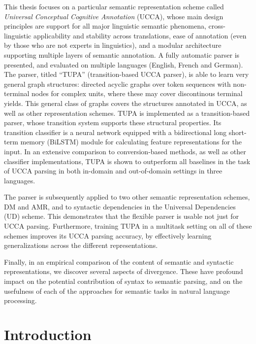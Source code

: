 \documentclass[12pt,a4paper]{report}
\begin{document}
This thesis focuses on a particular semantic representation scheme called
\textit{Universal Conceptual Cognitive Annotation} (UCCA),
whose main design principles are support for all major linguistic semantic phenomena,
cross-linguistic applicability and stability across translations,
ease of annotation (even by those who are not experts in linguistics),
and a modular architecture supporting multiple layers of semantic annotation.
A fully automatic parser is presented, and evaluated on multiple languages
(English, French and German).
The parser, titled ``TUPA'' (transition-based UCCA parser),
is able to learn very general graph structures:
directed acyclic graphs over token sequences with non-terminal nodes for complex
units, where these may cover discontinous terminal yields.
This general class of graphs covers the structures annotated in UCCA,
as well as other representation schemes.
TUPA is implemented as a transition-based parser, whose transition system
supports these structural properties.
Its transition classifier is a neural network equipped with a
bidirectional long short-term memory (BiLSTM) module for calculating
feature representations for the input.
In an extensive comparison to conversion-based methods, as well as
other classifier implementations, TUPA is shown to outperform all baselines
in the task of UCCA parsing in both in-domain and out-of-domain settings
in three languages.

The parser is subsequently applied to two other semantic representation schemes,
DM and AMR, and to syntactic dependencies in the Universal Dependencies (UD)
scheme. This demonstrates that the flexible parser is usable not just for UCCA
parsing.
Furthermore, training TUPA in a multitask setting on all of these schemes
improves its UCCA parsing accuracy, by effectively learning generalizations
across the different representations.

Finally, in an empirical comparison of
the content of semantic and syntactic representations, we discover several
aspects of divergence.  These have profound impact on the potential
contribution of syntax to semantic parsing, and on the usefulness of each of
the approaches for semantic tasks in natural language processing.

\pagebreak

\tableofcontents

\chapter{Introduction}
\end{document}
